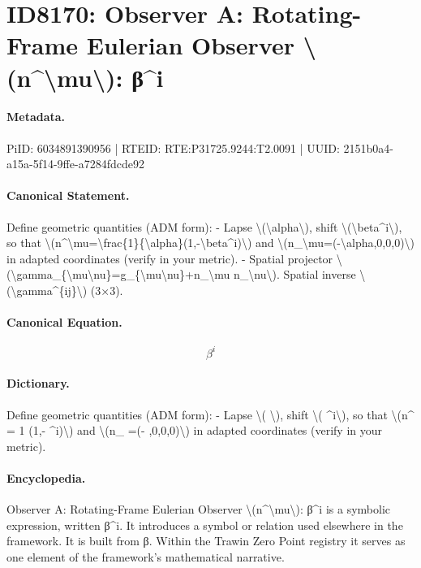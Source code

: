\section*{ID8170: Observer A: Rotating-Frame Eulerian Observer \textbackslash{}(n\textasciicircum{}\textbackslash{}mu\textbackslash{}): β\textasciicircum{}i}
\paragraph{Metadata.}
PiID: 6034891390956 | RTEID: RTE:P31725.9244:T2.0091 | UUID: 2151b0a4-a15a-5f14-9ffe-a7284fdcde92

\paragraph{Canonical Statement.}
Define geometric quantities (ADM form): - Lapse \textbackslash{}(\textbackslash{}alpha\textbackslash{}), shift \textbackslash{}(\textbackslash{}beta\textasciicircum{}i\textbackslash{}), so that \textbackslash{}(n\textasciicircum{}\textbackslash{}mu=\textbackslash{}frac\{1\}\{\textbackslash{}alpha\}(1,-\textbackslash{}beta\textasciicircum{}i)\textbackslash{}) and \textbackslash{}(n\_\textbackslash{}mu=(-\textbackslash{}alpha,0,0,0)\textbackslash{}) in adapted coordinates (verify in your metric). - Spatial projector \textbackslash{}(\textbackslash{}gamma\_\{\textbackslash{}mu\textbackslash{}nu\}=g\_\{\textbackslash{}mu\textbackslash{}nu\}+n\_\textbackslash{}mu n\_\textbackslash{}nu\textbackslash{}). Spatial inverse \textbackslash{}(\textbackslash{}gamma\textasciicircum{}\{ij\}\textbackslash{}) (3×3).

\paragraph{Canonical Equation.}
\[
\beta^i
\]

\paragraph{Dictionary.}
Define geometric quantities (ADM form): - Lapse \textbackslash{}( \textbackslash{}), shift \textbackslash{}( \textasciicircum{}i\textbackslash{}), so that \textbackslash{}(n\textasciicircum{} = 1 (1,- \textasciicircum{}i)\textbackslash{}) and \textbackslash{}(n\_ =(- ,0,0,0)\textbackslash{}) in adapted coordinates (verify in your metric).

\paragraph{Encyclopedia.}
Observer A: Rotating-Frame Eulerian Observer \textbackslash{}(n\textasciicircum{}\textbackslash{}mu\textbackslash{}): β\textasciicircum{}i is a symbolic expression, written β\textasciicircum{}i. It introduces a symbol or relation used elsewhere in the framework. It is built from β. Within the Trawin Zero Point registry it serves as one element of the framework's mathematical narrative.
